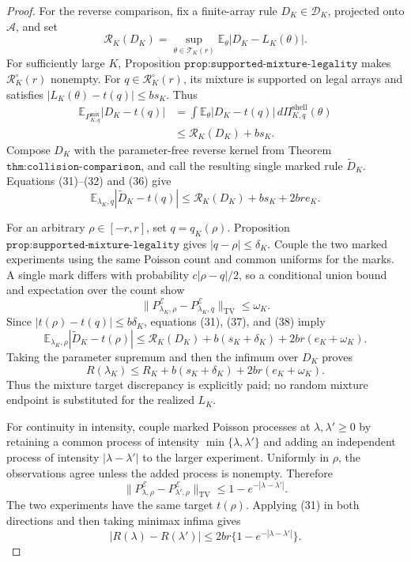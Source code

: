 \documentclass{article}
\begin{document}
\begin{proof}
For the reverse comparison, fix a finite-array rule
\(D_K\in\mathscr D_K\), projected onto \(\mathcal A\), and set
\[
 \mathcal R_K(D_K)=
 \sup_{\theta\in\mathcal T_K(r)}
 \mathbb E_\theta|D_K-L_K(\theta)|.
\]
For sufficiently large \(K\), Proposition
\(\texttt{prop:supported-mixture-legality}\) makes
\(\mathcal R_K^\circ(r)\) nonempty.  For
\(q\in\mathcal R_K^\circ(r)\), its mixture is supported on legal arrays
and satisfies \(|L_K(\theta)-t(q)|\le bs_K\).  Thus
\[
\begin{aligned}
 \mathbb E_{P^{\mathrm{mix}}_{K,q}}|D_K-t(q)|
 &=\int\mathbb E_\theta|D_K-t(q)|
      \,d\Pi_{K,q}^{\mathrm{shell}}(\theta)\\
 &\le\mathcal R_K(D_K)+bs_K.
\end{aligned}
\tag{36}
\]
Compose \(D_K\) with the parameter-free reverse kernel from Theorem
\(\texttt{thm:collision-comparison}\), and call the resulting single
marked rule \(\widetilde D_K\).  Equations (31)--(32) and (36) give
\[
 \mathbb E_{\lambda_K,q}|\widetilde D_K-t(q)|
 \le\mathcal R_K(D_K)+bs_K+2bre_K.
 \tag{37}
\]

For an arbitrary \(\rho\in[-r,r]\), set \(q=q_K(\rho)\).
Proposition \(\texttt{prop:supported-mixture-legality}\) gives
\(|q-\rho|\le\delta_K\).  Couple the two marked experiments using the
same Poisson count and common uniforms for the marks.  A single mark
differs with probability \(c|\rho-q|/2\), so a conditional union bound
and expectation over the count show
\[
 \|P^{\mathcal E}_{\lambda_K,\rho}
   -P^{\mathcal E}_{\lambda_K,q}\|_{\mathrm{TV}}
 \le\omega_K.
 \tag{38}
\]
Since \(|t(\rho)-t(q)|\le b\delta_K\), equations (31), (37), and (38)
imply
\[
 \mathbb E_{\lambda_K,\rho}|\widetilde D_K-t(\rho)|
 \le
 \mathcal R_K(D_K)+b(s_K+\delta_K)
 +2br(e_K+\omega_K).
 \tag{39}
\]
Taking the parameter supremum and then the infimum over \(D_K\) proves
\[
 R(\lambda_K)
 \le R_K+b(s_K+\delta_K)+2br(e_K+\omega_K).
 \tag{40}
\]
Thus the mixture target discrepancy is explicitly paid; no random
mixture endpoint is substituted for the realized \(L_K\).

For continuity in intensity, couple marked Poisson processes at
\(\lambda,\lambda'\ge0\) by retaining a common process of intensity
\(\min\{\lambda,\lambda'\}\) and adding an independent process of
intensity \(|\lambda-\lambda'|\) to the larger experiment.  Uniformly in
\(\rho\), the observations agree unless the added process is nonempty.
Therefore
\[
 \|P^{\mathcal E}_{\lambda,\rho}
   -P^{\mathcal E}_{\lambda',\rho}\|_{\mathrm{TV}}
 \le1-e^{-|\lambda-\lambda'|}.
\]
The two experiments have the same target \(t(\rho)\).  Applying (31) in
both directions and then taking minimax infima gives
\[
 |R(\lambda)-R(\lambda')|
 \le2br\{1-e^{-|\lambda-\lambda'|}\}.
 \tag{41}
\]


\end{proof}
\end{document}
